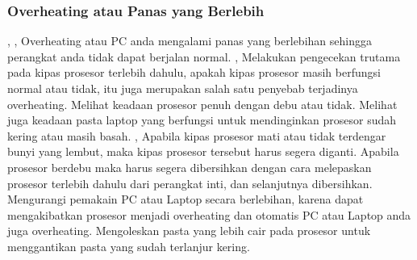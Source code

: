 \subsubsection{Overheating atau Panas yang Berlebih},
	,
Overheating atau PC anda mengalami panas yang berlebihan sehingga perangkat anda tidak dapat berjalan normal.
	,
Melakukan pengecekan trutama pada kipas prosesor terlebih dahulu, apakah kipas prosesor masih berfungsi normal atau tidak, itu
juga merupakan salah satu penyebab terjadinya overheating. Melihat keadaan prosesor penuh dengan debu atau tidak. Melihat juga
keadaan pasta laptop yang berfungsi untuk mendinginkan prosesor sudah kering atau masih basah.
	,
Apabila kipas prosesor mati atau tidak terdengar bunyi yang lembut, maka kipas prosesor tersebut harus segera diganti. Apabila
prosesor berdebu maka harus segera dibersihkan dengan cara melepaskan prosesor terlebih dahulu dari perangkat inti, dan
selanjutnya dibersihkan. Mengurangi pemakain PC atau Laptop secara berlebihan, karena dapat mengakibatkan prosesor menjadi
overheating dan otomatis PC atau Laptop anda juga overheating. Mengoleskan pasta yang lebih cair pada prosesor untuk 
menggantikan pasta yang sudah terlanjur kering.
\subsection{}